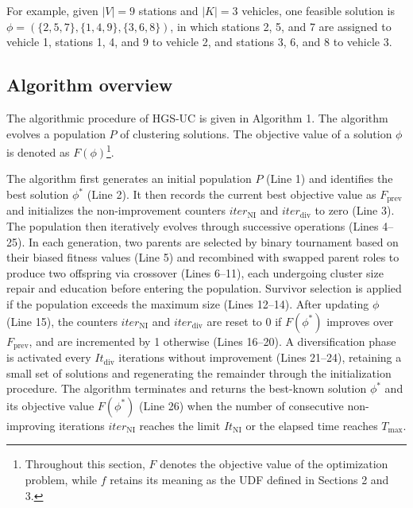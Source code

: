\documentclass[11pt]{article}
\numberwithin{table}{section}
\numberwithin{figure}{section}
\begin{document}
For example, given $\left| V \right|=9$ stations and $\left| K \right|=3$ vehicles, one feasible solution is $\phi =(\{2,5,7\},\{1,4,9\},\{3,6,8\})$, in which stations 2, 5, and 7 are assigned to vehicle 1, stations 1, 4, and 9 to vehicle 2, and stations 3, 6, and 8 to vehicle 3.

\subsection{Algorithm overview}

The algorithmic procedure of HGS-UC is given in Algorithm 1. The algorithm evolves a population $P$ of clustering solutions. The objective value of a solution $\phi$ is denoted as $F(\phi)$\footnote{Throughout this section, $F$ denotes the objective value of the optimization problem, while $f$ retains its meaning as the UDF defined in Sections 2 and 3.}.

The algorithm first generates an initial population $P$ (Line 1) and identifies the best solution $\phi^*$ (Line 2). It then records the current best objective value as ${{F}_{\text{prev}}}$ and initializes the non-improvement counters $ite{{r}_{\text{NI}}}$ and $ite{{r}_{\text{div}}}$ to zero (Line 3). The population then iteratively evolves through successive operations (Lines 4–25). In each generation, two parents are selected by binary tournament based on their biased fitness values (Line 5) and recombined with swapped parent roles to produce two offspring via crossover (Lines 6–11), each undergoing cluster size repair and education before entering the population. Survivor selection is applied if the population exceeds the maximum size (Lines 12–14). After updating $\phi$ (Line 15), the counters $ite{{r}_{\text{NI}}}$ and $ite{{r}_{\text{div}}}$ are reset to 0 if $F({{\phi }^{*}})$ improves over ${{F}_{\text{prev}}}$, and are incremented by 1 otherwise (Lines 16–20). A diversification phase is activated every $I{{t}_{\text{div}}}$ iterations without improvement (Lines 21–24), retaining a small set of solutions and regenerating the remainder through the initialization procedure. The algorithm terminates and returns the best-known solution $\phi^*$ and its objective value $F({{\phi }^{*}})$ (Line 26) when the number of consecutive non-improving iterations $ite{{r}_{\text{NI}}}$ reaches the limit $I{{t}_{\text{NI}}}$ or the elapsed time reaches ${{T}_{\max }}$.
\end{document}
